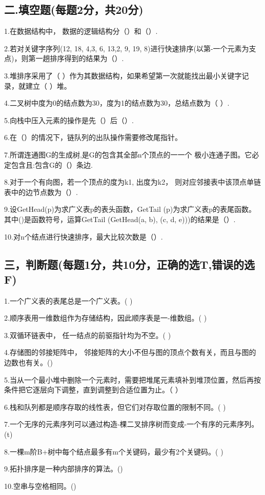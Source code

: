 \subsection{二.填空题(每题2分，共20分)}
1.在数据结构中， 数据的逻辑结构分（）和（）.

2.若对关键字序列(12, 18, 4,3, 6, 13,2, 9, 19, 8)进行快速排序(以第-一个元素为支点)，则第一趟排序得到的结果为（）.

3.堆排序采用了（ ）作为其数据结构，如果希望第一次就能找出最小关键字记录，就建立（ ）堆。

4.二叉树中度为0的结点数为30，度为1的结点数为30，总结点数为（  ）.

5.向栈中压入元素的操作是先（）后（）.

6.在（）的情况下，链队列的出队操作需要修改尾指针。

7.所谓连通图G的生成树,是G的包含其全部n个顶点的一一个 极小连通子图。它必定包含且:包含G的（）条边.

8.对于一个有向图，若一个顶点的度为k1, 出度为k2， 则对应邻接表中该顶点单链表中的边节点数为（）.

9.设GetHead(p)为求广义表p的表头函数，GetTail (p)为求广义表p的表尾函数。其中()是函数符号，运算GetTail (GetHead(a, b), (c, d, e)))的结果是（）.

10.对n个结点进行快速排序，最大比较次数是（）.

\subsection{三，判断题(每题1分，共10分，正确的选T,错误的选F)}
1.一个广义表的表尾总是一个广义表。( )

2.顺序表用一维数组作为存储结构，因此顺序表是一-维数组。( )

3.双循环链表中， 任一结点的前驱指针均为不空。( )

4.存储图的邻接矩阵中， 邻接矩阵的大小不但与图的顶点个数有关，而且与图的边数也有关。()

5.当从一个最小堆中删除一个元素时，需要把堆尾元素填补到堆顶位置，然后再按条件把它逐层向下调整，直到调整到合适位置为止。（  ）

6.栈和队列都是顺序存取的线性表，但它们对存取位置的限制不同。( )

7.一个无序的元素序列可以通过构造-棵二叉排序树而变成-一个有序的元素序列。(t)

8.一棵m阶B+树中每个结点最多有m个关键码，最少有2个关键码。( )

9.拓扑排序是一种内部排序的算法。()

10.空串与空格相同。()

